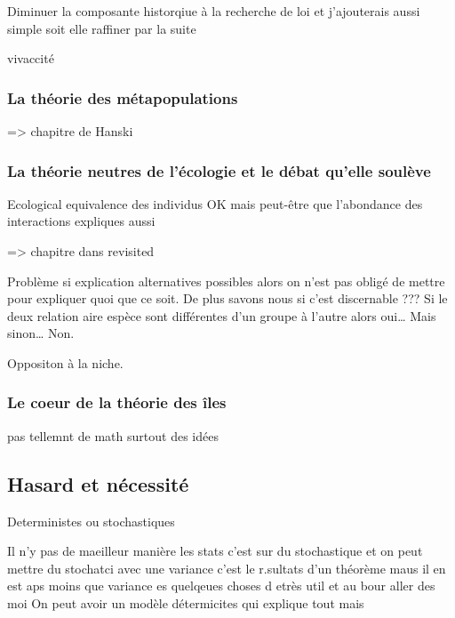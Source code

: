 Diminuer la composante historqiue à la recherche de loi et j'ajouterais
aussi simple soit elle raffiner par la suite

vivaccité

\subsubsection{La théorie des
métapopulations}\label{la-thuxe9orie-des-muxe9tapopulations}

=\textgreater{} chapitre de Hanski

\subsubsection{La théorie neutres de l'écologie et le débat qu'elle
soulève}\label{la-thuxe9orie-neutres-de-luxe9cologie-et-le-duxe9bat-quelle-souluxe8ve}

Ecological equivalence des individus OK mais peut-être que l'abondance
des interactions expliques aussi

=\textgreater{} chapitre dans revisited

Problème si explication alternatives possibles alors on n'est pas obligé
de mettre pour expliquer quoi que ce soit. De plus savons nous si c'est
discernable ??? Si le deux relation aire espèce sont différentes d'un
groupe à l'autre alors oui\ldots{} Mais sinon\ldots{} Non.

Oppositon à la niche.

\subsubsection{Le coeur de la théorie des
îles}\label{le-coeur-de-la-thuxe9orie-des-uxeeles}

pas tellemnt de math surtout des idées

\subsection*{Hasard et nécessité}\label{hasard-et-nuxe9cessituxe9}

Deterministes ou stochastiques

Il n'y pas de maeilleur manière les stats c'est sur du stochastique et
on peut mettre du stochatci avec une variance c'est le r.sultats d'un
théorème maus il en est aps moins que variance es quelqeues choses d
etrès util et au bour aller des moi On peut avoir un modèle détermicites
qui explique tout mais

